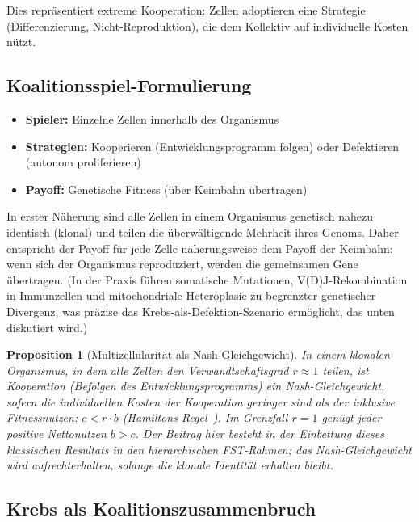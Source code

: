 \documentclass[12pt,a4paper]{article}
\newtheorem{proposition}{Proposition}
\theoremstyle{remark}
\begin{document}
Dies repräsentiert extreme Kooperation: Zellen adoptieren eine Strategie (Differenzierung, Nicht-Reproduktion), die dem Kollektiv auf individuelle Kosten nützt.

\subsection{Koalitionsspiel-Formulierung}

\begin{itemize}
    \item \textbf{Spieler:} Einzelne Zellen innerhalb des Organismus
    \item \textbf{Strategien:} Kooperieren (Entwicklungsprogramm folgen) oder Defektieren (autonom proliferieren)
    \item \textbf{Payoff:} Genetische Fitness (über Keimbahn übertragen)
\end{itemize}

In erster Näherung sind alle Zellen in einem Organismus genetisch nahezu identisch (klonal) und teilen die überwältigende Mehrheit ihres Genoms. Daher entspricht der Payoff für jede Zelle näherungsweise dem Payoff der Keimbahn: wenn sich der Organismus reproduziert, werden die gemeinsamen Gene übertragen. (In der Praxis führen somatische Mutationen, V(D)J-Rekombination in Immunzellen und mitochondriale Heteroplasie zu begrenzter genetischer Divergenz, was präzise das Krebs-als-Defektion-Szenario ermöglicht, das unten diskutiert wird.)

\begin{proposition}[Multizellularität als Nash-Gleichgewicht]
\label{prop:multicellularity}
In einem klonalen Organismus, in dem alle Zellen den Verwandtschaftsgrad $r \approx 1$ teilen, ist Kooperation (Befolgen des Entwicklungsprogramms) ein Nash-Gleichgewicht, sofern die individuellen Kosten der Kooperation geringer sind als der inklusive Fitnessnutzen: $c < r \cdot b$ (Hamiltons Regel~\citep{Hamilton1964}). Im Grenzfall $r = 1$ genügt jeder positive Nettonutzen $b > c$. Der Beitrag hier besteht in der Einbettung dieses klassischen Resultats in den hierarchischen FST-Rahmen; das Nash-Gleichgewicht wird aufrechterhalten, solange die klonale Identität erhalten bleibt.
\end{proposition}

\subsection{Krebs als Koalitionszusammenbruch}
\end{document}
